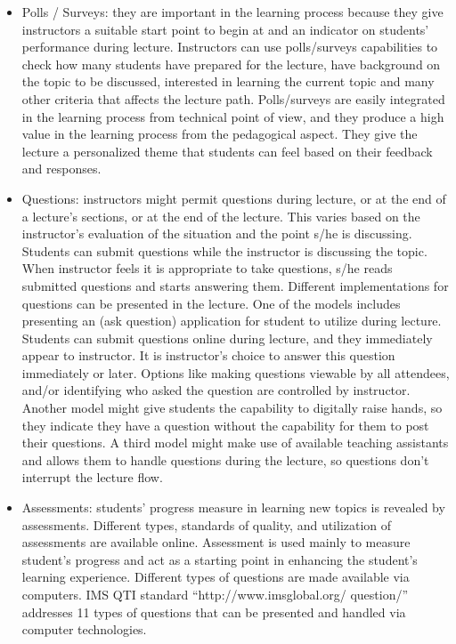\documentclass[12pt,a4paper,final,twoside,onecolumn,titlepage]{book}
\begin{document}
\begin{itemize}
\item Polls / Surveys: they are important in the learning process because they give instructors a suitable start point to begin at and an indicator on students’ performance during lecture. Instructors can use polls/surveys capabilities to check how many students have prepared for the lecture, have background on the topic to be discussed, interested in learning the current topic and many other criteria that affects the lecture path. Polls/surveys are easily integrated in the learning process from technical point of view, and they produce a high value in the learning process from the pedagogical aspect. They give the lecture a personalized theme that students can feel based on their feedback and responses.
\item Questions: instructors might permit questions during lecture, or at the end of a lecture’s sections, or at the end of the lecture. This varies based on the instructor’s evaluation of the situation and the point s/he is discussing. Students can submit questions while the instructor is discussing the topic. When instructor feels it is appropriate to take questions, s/he reads submitted questions and starts answering them. Different implementations for questions can be presented in the lecture. One of the models includes presenting an (ask question) application for student to utilize during lecture. Students can submit questions online during lecture, and they immediately appear to instructor. It is instructor’s choice to answer this question immediately or later. Options like making questions viewable by all attendees, and/or identifying who asked the question are controlled by instructor. Another model might give students the capability to digitally raise hands, so they indicate they have a question without the capability for them to post their questions. A third model might make use of available teaching assistants and allows them to handle questions during the lecture, so questions don’t interrupt the lecture flow.
\item Assessments: students’ progress measure in learning new topics is revealed by assessments. Different types, standards of quality, and utilization of assessments are available online. Assessment is used mainly to measure student’s progress and act as a starting point in enhancing the student’s learning experience. Different types of questions are made available via computers. IMS QTI standard “http://www.imsglobal.org/
question/” addresses 11 types of questions that can be presented and handled via computer technologies. 

\end{itemize}
\end{document}
